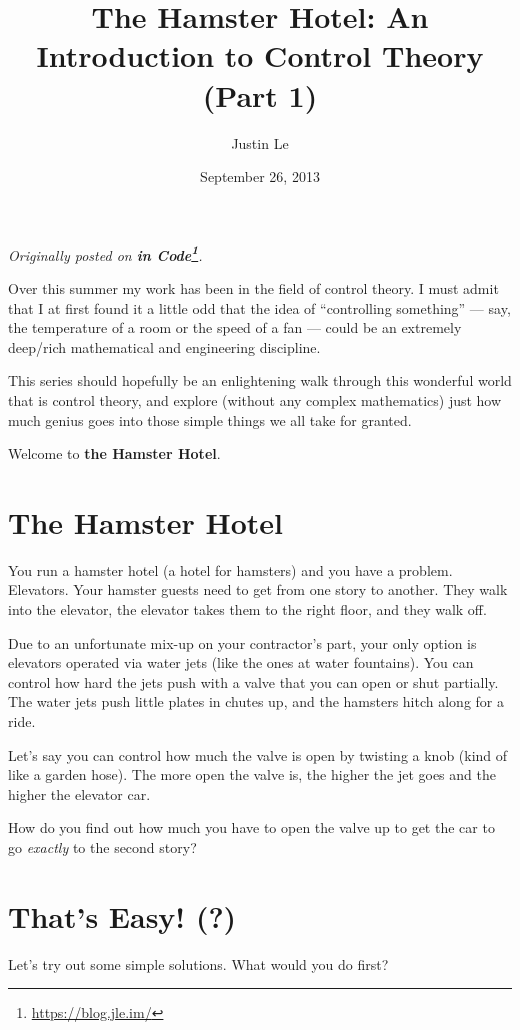 \documentclass[]{article}
\title{The Hamster Hotel: An Introduction to Control Theory (Part 1)}
\author{Justin Le}
\date{September 26, 2013}
\renewcommand{\href}[2]{#2\footnote{\url{#1}}}
\begin{document}
\maketitle

\emph{Originally posted on \textbf{\href{https://blog.jle.im/}{in
Code}}.}

Over this summer my work has been in the field of control theory. I must
admit that I at first found it a little odd that the idea of
``controlling something'' --- say, the temperature of a room or the
speed of a fan --- could be an extremely deep/rich mathematical and
engineering discipline.

This series should hopefully be an enlightening walk through this
wonderful world that is control theory, and explore (without any complex
mathematics) just how much genius goes into those simple things we all
take for granted.

Welcome to \textbf{the Hamster Hotel}.

\section{The Hamster Hotel}\label{the-hamster-hotel}

You run a hamster hotel (a hotel for hamsters) and you have a problem.
Elevators. Your hamster guests need to get from one story to another.
They walk into the elevator, the elevator takes them to the right floor,
and they walk off.

Due to an unfortunate mix-up on your contractor's part, your only option
is elevators operated via water jets (like the ones at water fountains).
You can control how hard the jets push with a valve that you can open or
shut partially. The water jets push little plates in chutes up, and the
hamsters hitch along for a ride.

Let's say you can control how much the valve is open by twisting a knob
(kind of like a garden hose). The more open the valve is, the higher the
jet goes and the higher the elevator car.

How do you find out how much you have to open the valve up to get the
car to go \emph{exactly} to the second story?

\section{That's Easy! (?)}\label{thats-easy}

Let's try out some simple solutions. What would you do first?
\end{document}
